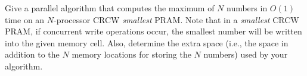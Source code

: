 Give a parallel algorithm that computes the maximum of $N$ numbers in
$O(1)$ time on an $N$-processor CRCW {\em smallest} PRAM. Note that in
a {\em smallest} CRCW PRAM, if concurrent write operations occur, the
smallest number will be written into the given memory cell.  Also,
determine the extra space (i.e., the space in addition to the $N$
memory locations for storing the $N$ numbers) used by your algorithm.
